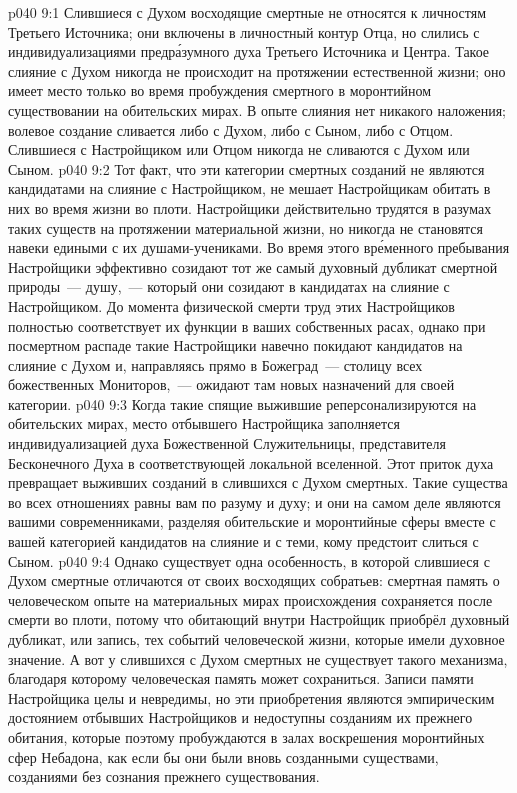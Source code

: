 \vs p040 9:1 Слившиеся с Духом восходящие смертные не относятся к личностям Третьего Источника; они включены в личностный контур Отца, но слились с индивидуализациями предр\'азумного духа Третьего Источника и Центра. Такое слияние с Духом никогда не происходит на протяжении естественной жизни; оно имеет место только во время пробуждения смертного в моронтийном существовании на обительских мирах. В опыте слияния нет никакого наложения; волевое создание сливается либо с Духом, либо с Сыном, либо с Отцом. Слившиеся с Настройщиком или Отцом никогда не сливаются с Духом или Сыном.
\vs p040 9:2 \pc Тот факт, что эти категории смертных созданий не являются кандидатами на слияние с Настройщиком, не мешает Настройщикам обитать в них во время жизни во плоти. Настройщики действительно трудятся в разумах таких существ на протяжении материальной жизни, но никогда не становятся навеки едиными с их душами\hyp{}учениками. Во время этого вр\'еменного пребывания Настройщики эффективно созидают тот же самый духовный дубликат смертной природы~--- душу,~--- который они созидают в кандидатах на слияние с Настройщиком. До момента физической смерти труд этих Настройщиков полностью соответствует их функции в ваших собственных расах, однако при посмертном распаде такие Настройщики навечно покидают кандидатов на слияние с Духом и, направляясь прямо в Божеград~--- столицу всех божественных Мониторов,~--- ожидают там новых назначений для своей категории.
\vs p040 9:3 Когда такие спящие выжившие реперсонализируются на обительских мирах, место отбывшего Настройщика заполняется индивидуализацией духа Божественной Служительницы, представителя Бесконечного Духа в соответствующей локальной вселенной. Этот приток духа превращает выживших созданий в слившихся с Духом смертных. Такие существа во всех отношениях равны вам по разуму и духу; и они на самом деле являются вашими современниками, разделяя обительские и моронтийные сферы вместе с вашей категорией кандидатов на слияние и с теми, кому предстоит слиться с Сыном.
\vs p040 9:4 \pc Однако существует одна особенность, в которой слившиеся с Духом смертные отличаются от своих восходящих собратьев: смертная память о человеческом опыте на материальных мирах происхождения сохраняется после смерти во плоти, потому что обитающий внутри Настройщик приобрёл духовный дубликат, или запись, тех событий человеческой жизни, которые имели духовное значение. А вот у слившихся с Духом смертных не существует такого механизма, благодаря которому человеческая память может сохраниться. Записи памяти Настройщика целы и невредимы, но эти приобретения являются эмпирическим достоянием отбывших Настройщиков и недоступны созданиям их прежнего обитания, которые поэтому пробуждаются в залах воскрешения моронтийных сфер Небадона, как если бы они были вновь созданными существами, созданиями без сознания прежнего существования.
